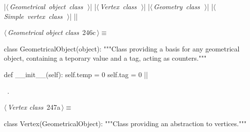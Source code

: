 \documentclass[%
    a4paper,    %
    justified,  %
    nobib,      %
    openany     %
]{tufte-book}
\makeatletter
\renewcommand{\label}[1]{\@tufte@label{##1}}%
\makeatother
\begin{document}
\begin{fullwidth}
\begin{flushleft}
\begin{minipage}{\linewidth}
\begin{pythoncode}
|\hbox{$\langle\,${\itshape Geometrical object class}\nobreak\ {\footnotesize {}}$\,\rangle$}|
|\hbox{$\langle\,${\itshape Vertex class}\nobreak\ {\footnotesize {}}$\,\rangle$}|
|\hbox{$\langle\,${\itshape Geometry class}\nobreak\ {\footnotesize {}}$\,\rangle$}|
|\hbox{$\langle\,${\itshape Simple vertex class}\nobreak\ {\footnotesize {}}$\,\rangle$}|
|\NWsep|
\end{pythoncode}
\vspace{1.5ex}
\footnotesize
\begin{list}{}{\setlength{\itemsep}{-\parsep}\setlength{\itemindent}{-\leftmargin}}

\item{}
\end{list}
\end{minipage}\vspace{4ex}
\end{flushleft}
\begin{flushleft} \small
\begin{minipage}{\linewidth}\label{scrap269}\raggedright\small
{} $\langle\,${\itshape Geometrical object class}\nobreak\ {\footnotesize {246c}}$\,\rangle\equiv$
\vspace{-1ex}
\begin{pythoncode}
class GeometricalObject(object):
    """Class providing a basis for any geometrical object, containing a
    teporary value and a tag, acting as counters."""

    def __init__(self):
        self.temp = 0
        self.tag  = 0
|\NWsep|
\end{pythoncode}
\vspace{1.5ex}
\footnotesize
\begin{list}{}{\setlength{\itemsep}{-\parsep}\setlength{\itemindent}{-\leftmargin}}
\item \NWtxtMacroRefIn\ .

\item{}
\end{list}
\end{minipage}\vspace{4ex}
\end{flushleft}
\begin{flushleft} \small
\begin{minipage}{\linewidth}\label{scrap270}\raggedright\small
{} $\langle\,${\itshape Vertex class}\nobreak\ {\footnotesize {247a}}$\,\rangle\equiv$
\vspace{-1ex}
\begin{pythoncode}
class Vertex(GeometricalObject):
    """Class providing an abstraction to vertices."""


\end{pythoncode}
\end{minipage}
\end{flushleft}
\end{fullwidth}
\end{document}
